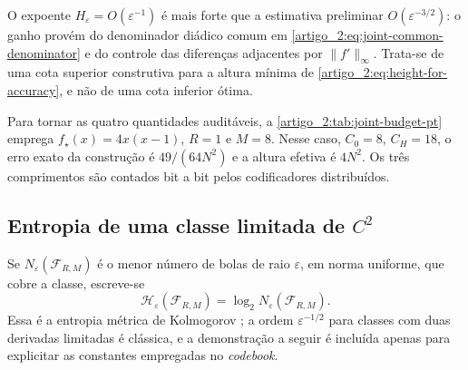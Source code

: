 O expoente $H_\varepsilon=O(\varepsilon^{-1})$ é mais forte que a estimativa
preliminar $O(\varepsilon^{-3/2})$: o ganho provém do denominador diádico comum
em \eqref{artigo_2:eq:joint-common-denominator} e do controle das diferenças adjacentes
por $\|f'\|_\infty$. Trata-se de uma cota superior construtiva para a altura
mínima de \eqref{artigo_2:eq:height-for-accuracy}, e não de uma cota inferior ótima.

Para tornar as quatro quantidades auditáveis, a
\cref{artigo_2:tab:joint-budget-pt} emprega $f_\star(x)=4x(x-1)$, $R=1$ e $M=8$. Nesse
caso, $C_0=8$, $C_H=18$, o erro exato da construção é
$49/(64N^2)$ e a altura efetiva é $4N^2$. Os três comprimentos são contados
bit a bit pelos codificadores distribuídos.

\begin{table}[t]
\centering
\caption{Construção do \cref{artigo_2:thm:joint-budget} para
$f_\star(x)=4x(x-1)$. $e_{\rm cert}$ é a cota
\eqref{artigo_2:eq:joint-dyadic-error}, $e_{\rm exato}$ é obtido em aritmética
racional nos extremos e no ponto crítico de cada folha, e $H_N=18N^2$ é a
cota provada.}\label{artigo_2:tab:joint-budget-pt}
\small
{}
\end{table}

\subsection{Entropia de uma classe limitada de \texorpdfstring{$C^2$}{C2}}

Se $N_\varepsilon(\mathcal{F}_{R,M})$ é o menor número de bolas de raio $\varepsilon$, em norma uniforme, que cobre a classe, escreve-se
\[
 \mathcal{H}_\varepsilon(\mathcal{F}_{R,M})=\log_2N_\varepsilon(\mathcal{F}_{R,M}).
\]
Essa é a entropia métrica de Kolmogorov \citep{artigo_1-kolmogorov1959,artigo_1-lorentz1996}; a ordem $\varepsilon^{-1/2}$ para classes com duas derivadas limitadas é clássica, e a demonstração a seguir é incluída apenas para explicitar as constantes empregadas no \emph{codebook}.

